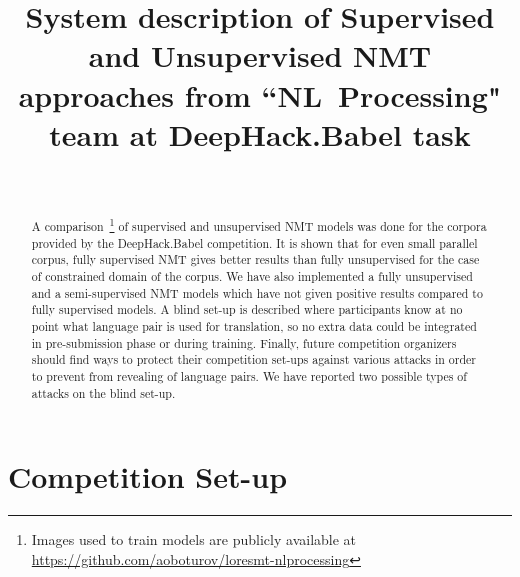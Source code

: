 \documentclass[]{article}
\begin{document}
\begin{acronym}
\end{acronym}

\title{\bf System description of Supervised and Unsupervised  \acl{NMT} approaches from {``NL~Processing"} team at DeepHack.Babel task}
\author{ \hfill  {}\\
\AND
         \hfill {}
}

\maketitle
\pagestyle{empty}

\begin{abstract}
A comparison~\footnote{Images used to train models are publicly available at \url{https://github.com/aoboturov/loresmt-nlprocessing}} of supervised and unsupervised \ac{NMT} models was done for the corpora provided by the DeepHack.Babel competition.
It is shown that for even small parallel corpus, fully supervised \ac{NMT} gives better results than fully unsupervised for the case of constrained domain of the corpus.
We have also implemented a fully unsupervised and a semi-supervised \ac{NMT} models which have not given positive results compared to fully supervised models.
A blind set-up is described where participants know at no point what language pair is used for translation, so no extra data could be integrated in pre-submission phase or during training.
Finally, future competition organizers should find ways to protect their competition set-ups against various attacks in order to prevent from revealing of language pairs.
We have reported two possible types of attacks on the blind set-up.
\end{abstract}

\acresetall
\section{Competition Set-up}
\label{sect:set_up}
\end{document}

